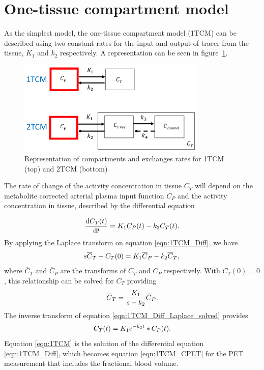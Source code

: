 \section{One-tissue compartment model}
As the simplest model, the one-tissue compartment model (1TCM) can be described using two constant rates for the input and output of tracer from the tissue, $K_1$ and $k_2$ respectively. A representation can be seen in figure~\ref{fig:1_2TCM}.

\begin{figure}[ht!]
	\includegraphics[width=0.8\textwidth]{2_Theory_Methods/figures/TissueCompartmentModels.pdf}
	\centering
	\caption{Representation of compartments and exchanges rates for 1TCM (top) and 2TCM (bottom)}
	\centering
	\label{fig:1_2TCM}
\end{figure}

The rate of change of the activity concentration in tissue $C_T$ will depend on the metabolite corrected arterial plasma input function $C_P$ and the activity concentration in tissue, described by the differential equation

\begin{equation}
  \frac{\mathrm d C_T(t)}{\mathrm d t} = K_1 C_P(t) - k_2 C_T(t) \\ . \\
  \label{eqn:1TCM_Diff}
\end{equation}
By applying the Laplace transform on equation \ref{eqn:1TCM_Diff}, we have
\begin{equation}
  s \overline{C}_T - C_T(0) = K_1 \overline{C}_P - k_2 \overline{C}_T  \\  ,  \\ 
  \label{eqn:1TCM_Diff_Laplace}
\end{equation}
where $\overline{C}_T$ and $\overline{C}_P$ are the transforms of ${C_T}$ and ${C_P}$ respectively. With $C_T(0)=0$, this relationship can be solved for $\overline{C}_T$ providing
\begin{equation}
\overline{C}_T =  \frac{K_1}{s+k_2} \overline{C}_P  \\  .  \\ 
  \label{eqn:1TCM_Diff_Laplace_solved}
\end{equation}
The inverse transform of equation \ref{eqn:1TCM_Diff_Laplace_solved} provides
\begin{equation}
   C_T(t) = K_1 e^{-k_2 t} \ast C_P(t)  \\  .  \\  
  \label{eqn:1TCM}
\end{equation}
Equation \ref{eqn:1TCM} is the solution of the differential equation \ref{eqn:1TCM_Diff}, which becomes equation \ref{eqn:1TCM_CPET} for the PET measurement that includes the fractional blood volume. 

